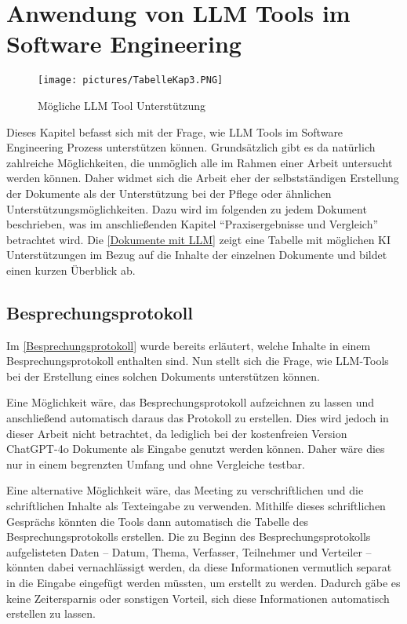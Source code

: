 \chapter{Anwendung von LLM Tools im Software Engineering} 

\begin{figure}
    \centering
    \texttt{[image: pictures/TabelleKap3.PNG]}
    \caption{Mögliche LLM Tool Unterstützung}
    \label{Dokumente mit LLM}
\end{figure}

Dieses Kapitel befasst sich mit der Frage, wie LLM Tools im Software Engineering Prozess unterstützen können.
Grundsätzlich gibt es da natürlich zahlreiche Möglichkeiten, die unmöglich alle im Rahmen einer Arbeit untersucht 
werden können. Daher widmet sich die Arbeit eher der selbstständigen Erstellung der Dokumente als der Unterstützung bei 
der Pflege oder ähnlichen Unterstützungsmöglichkeiten. Dazu wird im folgenden zu jedem Dokument beschrieben,
was im anschließenden Kapitel ``Praxisergebnisse und Vergleich'' betrachtet wird. Die \autoref{Dokumente mit LLM}
zeigt eine Tabelle mit möglichen KI Unterstützungen im Bezug auf die Inhalte der einzelnen Dokumente und bildet 
einen kurzen Überblick ab.

\section{Besprechungsprotokoll}  \label{LLMBesprechungsprotokoll}

Im \autoref{Besprechungsprotokoll} wurde bereits erläutert, welche Inhalte in einem Besprechungsprotokoll enthalten 
sind. Nun stellt sich die Frage, wie LLM-Tools bei der Erstellung eines solchen Dokuments unterstützen können.

Eine Möglichkeit wäre, das Besprechungsprotokoll aufzeichnen zu lassen und anschließend automatisch daraus das 
Protokoll zu erstellen. Dies wird jedoch in dieser Arbeit nicht betrachtet, da lediglich bei der kostenfreien Version 
ChatGPT-4o Dokumente als Eingabe genutzt werden können. Daher wäre dies nur in einem begrenzten Umfang und ohne Vergleiche 
testbar.

Eine alternative Möglichkeit wäre, das Meeting zu verschriftlichen und die schriftlichen Inhalte als Texteingabe zu 
verwenden. Mithilfe dieses schriftlichen Gesprächs könnten die Tools dann automatisch die Tabelle des 
Besprechungsprotokolls erstellen. Die zu Beginn des Besprechungsprotokolls aufgelisteten Daten – Datum, Thema, 
Verfasser, Teilnehmer und Verteiler – könnten dabei vernachlässigt werden, da diese Informationen vermutlich separat 
in die Eingabe eingefügt werden müssten, um erstellt zu werden. Dadurch gäbe es keine Zeitersparnis oder sonstigen 
Vorteil, sich diese Informationen automatisch erstellen zu lassen.


